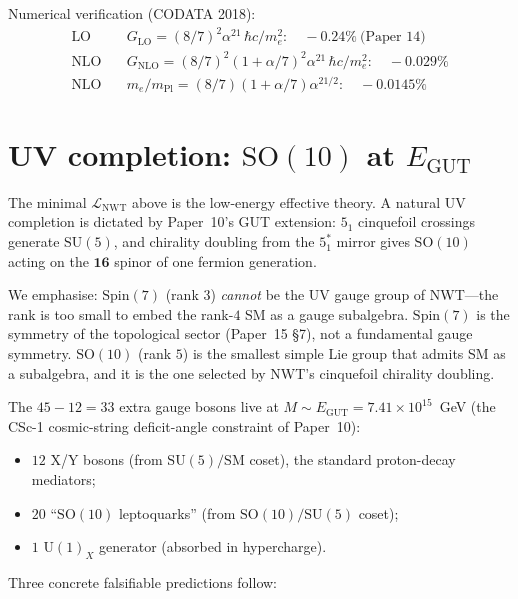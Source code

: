 \documentclass[11pt]{article}
\newcommand{\Lnwt}{\mathcal{L}_\text{NWT}}
\begin{document}
Numerical verification (CODATA 2018):
\begin{align}
  \text{LO}\quad
  &G_\text{LO}  = (8/7)^2 \alpha^{21}\,\hbar c/m_e^2 :\quad
  -0.24\%\ \text{(Paper~14)} \\
  \text{NLO}\quad
  &G_\text{NLO}  = (8/7)^2 (1+\alpha/7)^2 \alpha^{21}\,\hbar c/m_e^2 :\quad
  -0.029\% \\
  \text{NLO}\quad
  &m_e/m_\text{Pl} = (8/7)(1+\alpha/7) \alpha^{21/2} :\quad
  -0.0145\%
\end{align}

\section{UV completion: $\mathrm{SO}(10)$ at $E_\text{GUT}$}
\label{sec:UV}

The minimal $\Lnwt$ above is the low-energy effective theory.
A natural UV completion is dictated by Paper~10's GUT extension:
$5_1$ cinquefoil crossings generate $\mathrm{SU}(5)$, and chirality
doubling from the $5_1^*$ mirror gives $\mathrm{SO}(10)$ acting on
the $\mathbf{16}$ spinor of one fermion generation.

We emphasise: $\mathrm{Spin}(7)$ (rank $3$) \emph{cannot} be the UV
gauge group of NWT---the rank is too small to embed the rank-$4$
SM as a gauge subalgebra.  $\mathrm{Spin}(7)$ is the symmetry of
the topological sector (Paper~15 \S7), not a fundamental gauge
symmetry.  $\mathrm{SO}(10)$ (rank $5$) is the smallest simple Lie
group that admits SM as a subalgebra, and it is the one selected by
NWT's cinquefoil chirality doubling.

The $45 - 12 = 33$ extra gauge bosons live at $M \sim E_\text{GUT}
= 7.41 \times 10^{15}$~GeV (the CSc-1 cosmic-string deficit-angle
constraint of Paper~10):

\begin{itemize}\setlength\itemsep{1pt}
\item $12$ X/Y bosons (from $\mathrm{SU}(5)/\text{SM}$ coset),
the standard proton-decay mediators;
\item $20$ ``$\mathrm{SO}(10)$ leptoquarks'' (from
$\mathrm{SO}(10) / \mathrm{SU}(5)$ coset);
\item $1$ $\mathrm{U}(1)_X$ generator (absorbed in hypercharge).
\end{itemize}

Three concrete falsifiable predictions follow:
\end{document}
